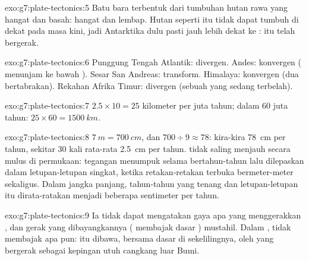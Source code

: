 \begin{solution}{exo:g7:plate-tectonics:5}
Batu bara terbentuk dari tumbuhan hutan rawa yang hangat dan basah: 
hangat dan lembap. Hutan seperti itu tidak dapat tumbuh di dekat  pada masa kini, jadi Antarktika dulu pasti jauh lebih dekat ke
:  itu telah bergerak.
\end{solution}

\begin{solution}{exo:g7:plate-tectonics:6}
Punggung Tengah Atlantik: divergen. Andes: konvergen ( 
menunjam ke bawah ). Sesar San Andreas: transform. Himalaya: konvergen
(dua  bertabrakan). Rekahan Afrika Timur: divergen (sebuah  yang
sedang terbelah).
\end{solution}

\begin{solution}{exo:g7:plate-tectonics:7}
$2.5 \times 10 = 25$ kilometer per juta tahun; dalam 60 juta tahun:
$25 \times 60 = \qty{1500}{km}$.
\end{solution}

\begin{solution}{exo:g7:plate-tectonics:8}
$\qty{7}{m} = \qty{700}{cm}$, dan $700 \div 9 \approx 78$: kira-kira
\qty{78}{cm} per tahun, sekitar 30 kali rata-rata \qty{2.5}{cm} per tahun.
 tidak saling menjauh secara mulus di permukaan: tegangan
menumpuk selama bertahun-tahun lalu dilepaskan dalam letupan-letupan
singkat, ketika retakan-retakan terbuka bermeter-meter sekaligus. Dalam
jangka panjang, tahun-tahun yang tenang dan letupan-letupan itu dirata-ratakan
menjadi beberapa sentimeter per tahun.
\end{solution}

\begin{solution}{exo:g7:plate-tectonics:9}
Ia tidak dapat mengatakan gaya apa yang menggerakkan , dan gerak yang
dibayangkannya ( membajak dasar ) mustahil. Dalam ,  tidak membajak apa pun:  itu dibawa, bersama dasar
 di sekelilingnya, oleh  yang bergerak sebagai
kepingan utuh cangkang luar Bumi.
\end{solution}

